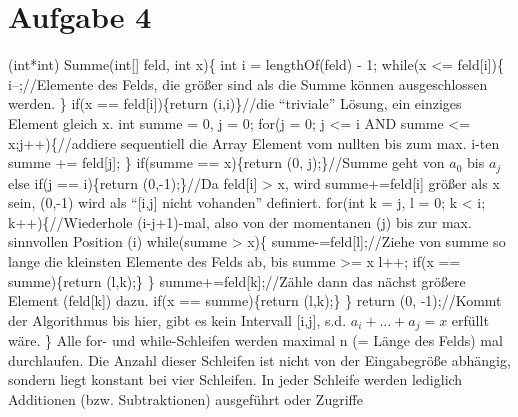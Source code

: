 \documentclass[a4paper,10pt,oneside,leqno]{scrartcl}
\begin{document}
\section*{Aufgabe 4}
(int*int) Summe(int[] feld, int x)\{\newline
int i = lengthOf(feld) - 1;\newline
while(x <= feld[i])\{\newline
i--;//Elemente des Felds, die größer sind als die Summe können ausgeschlossen werden.\newline
\}\newline
if(x == feld[i])\{return (i,i)\}//die ``triviale'' Lösung, ein einziges Element gleich x.\newline
int summe = 0, j = 0;\newline
for(j = 0; j <= i AND summe <= x;j++)\{//addiere sequentiell die Array Element vom nullten bis zum max. i-ten\newline
summe += feld[j];\newline
\}\newline
if(summe == x)\{return (0, j);\}//Summe geht von $a_0$ bis $a_j$\newline
else if(j == i)\{return (0,-1);\}//Da feld[i] > x, wird summe+=feld[i] größer als x sein, (0,-1) wird als ``[i,j] nicht vohanden'' definiert.\newline
for(int k = j, l = 0; k < i; k++)\{//Wiederhole (i-j+1)-mal, also von der momentanen (j) bis zur max. sinnvollen Position (i)\newline
while(summe > x)\{\newline
summe-=feld[l];//Ziehe von summe so lange die kleinsten Elemente des Felds ab, bis summe >= x\newline
l++;\newline
if(x == summe)\{return (l,k);\}\newline
\}\newline
summe+=feld[k];//Zähle dann das nächst größere Element (feld[k]) dazu.\newline
if(x == summe)\{return (l,k);\}\newline
\}\newline
return (0, -1);//Kommt der Algorithmus bis hier, gibt es kein Intervall [i,j], s.d. $a_i+...+a_j = x$ erfüllt wäre.\newline
\}\newline
Alle for- und while-Schleifen werden maximal n (= Länge des Felds) mal durchlaufen. Die Anzahl dieser Schleifen ist nicht von der Eingabegröße
abhängig, sondern liegt konstant bei vier Schleifen. In jeder Schleife werden lediglich Additionen (bzw. Subtraktionen) ausgeführt oder Zugriffe
\end{document}
